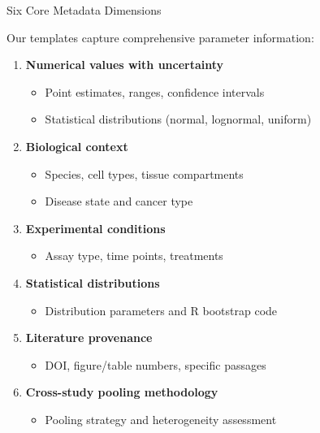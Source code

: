 \documentclass[10pt]{beamer}
\begin{document}
\begin{frame}{Six Core Metadata Dimensions}

  Our templates capture comprehensive parameter information:

  \vspace{0.3cm}

  \begin{enumerate}
    \item \textbf{Numerical values with uncertainty}
    \begin{itemize}
      \item Point estimates, ranges, confidence intervals
      \item Statistical distributions (normal, lognormal, uniform)
    \end{itemize}

    \item \textbf{Biological context}
    \begin{itemize}
      \item Species, cell types, tissue compartments
      \item Disease state and cancer type
    \end{itemize}

    \item \textbf{Experimental conditions}
    \begin{itemize}
      \item Assay type, time points, treatments
    \end{itemize}

    \item \textbf{Statistical distributions}
    \begin{itemize}
      \item Distribution parameters and R bootstrap code
    \end{itemize}

    \item \textbf{Literature provenance}
    \begin{itemize}
      \item DOI, figure/table numbers, specific passages
    \end{itemize}

    \item \textbf{Cross-study pooling methodology}
    \begin{itemize}
      \item Pooling strategy and heterogeneity assessment
    \end{itemize}
  \end{enumerate}

\end{frame}
\end{document}
